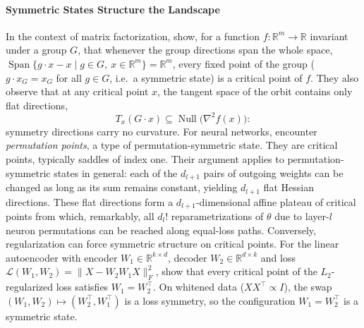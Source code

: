 \documentclass[mathematics,review,submit,moreauthors]{Definitions/mdpi}
\begin{document}
\paragraph{Symmetric States Structure the Landscape}
In the context of matrix factorization, \citet{li2018} show, for a function $f:\mathbb{R}^m\to\mathbb{R}$ invariant under a group $G$, that whenever the group directions span the whole space, $\operatorname{Span}\{g\cdot x-x \mid g\in G,\ x\in\mathbb{R}^m\}=\mathbb{R}^m$, every fixed point of the group ($g\cdot x_G=x_G$ for all $g\in G$, i.e.\ a symmetric state) is a critical point of $f$.
They also observe that at any critical point $x$, the tangent space of the orbit contains only flat directions,
\begin{equation*}
    T_x(G\cdot x)\subseteq\operatorname{Null}\big(\nabla^2 f(x)\big):
\end{equation*}
symmetry directions carry no curvature.
For neural networks, \citet{brea2019} encounter \emph{permutation points}, a type of permutation-symmetric state.
They are critical points, typically saddles of index one.
Their argument applies to permutation-symmetric states in general: each of the $d_{l+1}$ pairs of outgoing weights can be changed as long as its sum remains constant, yielding $d_{l+1}$ flat Hessian directions.
These flat directions form a $d_{l+1}$-dimensional affine plateau of critical points from which, remarkably, all $d_l!$ reparametrizations of $\theta$ due to layer-$l$ neuron permutations can be reached along equal-loss paths.
Conversely, regularization can force symmetric structure on critical points.
For the linear autoencoder with encoder $W_1\in\mathbb{R}^{k\times d}$, decoder $W_2\in\mathbb{R}^{d\times k}$ and loss $\mathcal{L}(W_1,W_2)=\lVert X-W_2W_1X\rVert_F^2$, \citet{kunin2019p3icml} show that every critical point of the $L_2$-regularized loss satisfies $W_1=W_2^{\top}$. On whitened data ($XX^\top\propto I$), the swap $(W_1,W_2)\mapsto(W_2^{\top},W_1^{\top})$ is a loss symmetry, so the configuration $W_1=W_2^{\top}$ is a symmetric state.
\end{document}
